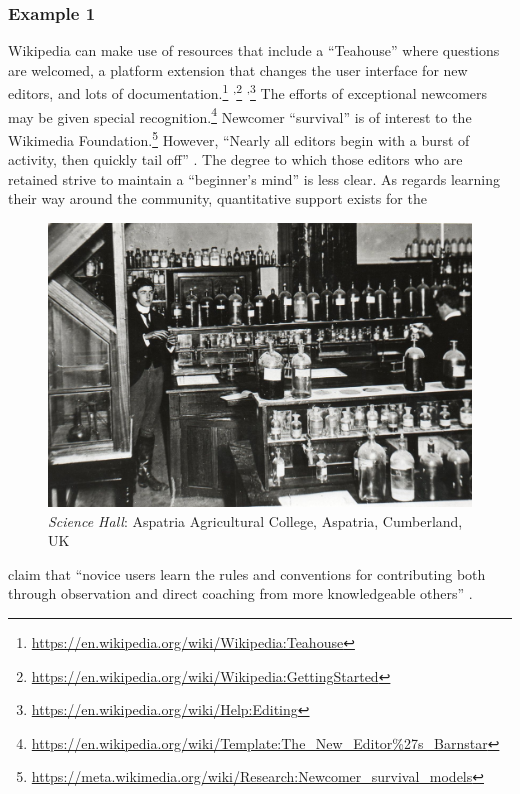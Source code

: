 \subsubsection*{Example 1} Wikipedia  can make use of resources that
include a ``Teahouse'' where questions are welcomed, a platform
extension that changes the user interface for new editors, and lots of
documentation.\footnote{\url{https://en.wikipedia.org/wiki/Wikipedia:Teahouse}}%
\textsuperscript{,}\footnote{\url{https://en.wikipedia.org/wiki/Wikipedia:GettingStarted}}%
\textsuperscript{,}\footnote{\url{https://en.wikipedia.org/wiki/Help:Editing}}
The efforts of exceptional newcomers may be given special
recognition.\footnote{\url{https://en.wikipedia.org/wiki/Template:The_New_Editor\%27s_Barnstar}}
Newcomer ``survival'' is of interest to the Wikimedia
Foundation.\footnote{\url{https://meta.wikimedia.org/wiki/Research:Newcomer_survival_models}}
However, ``Nearly all editors begin with a burst of activity, then
quickly tail off'' \cite{panciera2009wikipedians}.  The degree to
which those editors who are retained strive to maintain a ``beginner's mind''
is less clear.  As regards learning their way around the
community, quantitative support exists \cite{panciera2009wikipedians}
for the 
\begin{figure}
\vspace{-.5cm}
\begin{center}
\includegraphics[width=.45\textwidth,trim=0 20 0 20, clip=true]{The_Science_Laboratory}
\end{center}
\vspace{-.5cm}
\captionsetup{font=footnotesize,width=.45\textwidth}
\caption{\textsl{Science Hall}: Aspatria Agricultural College, Aspatria, Cumberland, UK 
\label{science-laboratory}}
\vspace{-.9cm}
\end{figure}
claim that ``novice users learn the rules and conventions
for
contributing both through observation and direct coaching from more
knowledgeable others'' \cite{bryant2005becoming}.


